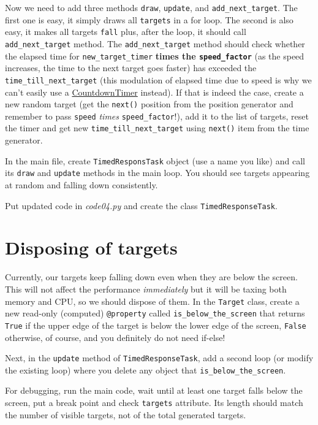 \documentclass[
]{book}
\begin{document}
Now we need to add three methods \texttt{draw}, \texttt{update}, and \texttt{add\_next\_target}. The first one is easy, it simply draws all \texttt{targets} in a for loop. The second is also easy, it makes all targets \texttt{fall} plus, after the loop, it should call \texttt{add\_next\_target} method. The \texttt{add\_next\_target} method should check whether the elapsed time for \texttt{new\_target\_timer} \textbf{times the \texttt{speed\_factor}} (as the speed increases, the time to the next target goes faster) has exceeded the \texttt{time\_till\_next\_target} (this modulation of elapsed time due to speed is why we can't easily use a \href{https://psychopy.org/api/clock.html\#psychopy.clock.CountdownTimer}{CountdownTimer} instead). If that is indeed the case, create a new random target (get the \texttt{next()} position from the position generator and remember to pass \texttt{speed} \emph{times} \texttt{speed\_factor}!), add it to the list of targets, reset the timer and get new \texttt{time\_till\_next\_target} using \texttt{next()} item from the time generator.

In the main file, create \texttt{TimedResponsTask} object (use a name you like) and call its \texttt{draw} and \texttt{update} methods in the main loop. You should see targets appearing at random and falling down consistently.

Put updated code in \emph{code04.py} and create the class \texttt{TimedResponseTask}.

\hypertarget{disposing-of-targets}{%
\section{Disposing of targets}\label{disposing-of-targets}}

Currently, our targets keep falling down even when they are below the screen. This will not affect the performance \emph{immediately} but it will be taxing both memory and CPU, so we should dispose of them. In the \texttt{Target} class, create a new read-only (computed) \texttt{@property} called \texttt{is\_below\_the\_screen} that returns \texttt{True} if the upper edge of the target is below the lower edge of the screen, \texttt{False} otherwise, of course, and you definitely do not need if-else!

Next, in the \texttt{update} method of \texttt{TimedResponseTask}, add a second loop (or modify the existing loop) where you delete any object that \texttt{is\_below\_the\_screen}.

For debugging, run the main code, wait until at least one target falls below the screen, put a break point and check \texttt{targets} attribute. Its length should match the number of visible targets, not of the total generated targets.
\end{document}
